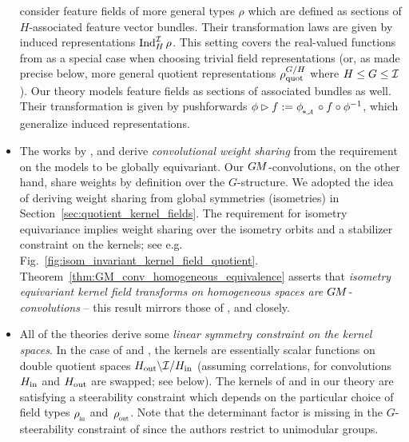 \begin{itemize}
{        }
        \citet{Cohen2018-intertwiners}\cite{Cohen2019-generaltheory} consider feature fields of more general types $\rho$
        which are defined as sections of $H$-associated feature vector bundles.
        Their transformation laws are given by induced representations $\operatorname{Ind}_H^{\mathcal{I}} \rho$.
        This setting covers the real-valued functions from \cite{Kondor2018-GENERAL,bekkers2020bspline} as a special case when choosing trivial field representations
        (or, as made precise below, more general quotient representations $\rho_\textup{quot}^{G/H}$ where $H\leq G\leq\mathcal{I}$).
        Our theory models feature fields as sections of associated bundles as well.
        Their transformation is given by pushforwards $\phi \rhd f := \dphiA \circ f \circ \phi^{-1}$, which generalize induced representations.
    \item[{\rule[2.2pt]{2pt}{2pt}}]
        The works by \citet{Kondor2018-GENERAL}, \citet{Cohen2018-intertwiners}\cite{Cohen2019-generaltheory} and \citet{bekkers2020bspline} derive \emph{convolutional weight sharing} from the requirement on the models to be globally equivariant.
        Our $G\mkern-1.4muM$-convolutions, on the other hand, share weights by definition over the $G$-structure.
        We adopted the idea of deriving weight sharing from global symmetries (isometries) in Section~\ref{sec:quotient_kernel_fields}.
        The requirement for isometry equivariance implies weight sharing over the isometry orbits and a stabilizer constraint on the kernels; see e.g. Fig.~\ref{fig:isom_invariant_kernel_field_quotient}.
        Theorem~\ref{thm:GM_conv_homogeneous_equivalence} asserts that \emph{isometry equivariant kernel field transforms on homogeneous spaces are $G\mkern-1.4muM$-convolutions} -- this result mirrors those of \citet{Kondor2018-GENERAL}, \citet{Cohen2018-intertwiners}\cite{Cohen2019-generaltheory} and \citet{bekkers2020bspline}
        closely.
    \item[{\rule[2.2pt]{2pt}{2pt}}]
        All of the theories derive some \emph{linear symmetry constraint on the kernel spaces}.
        In the case of \citet{Kondor2018-GENERAL} and \citet{bekkers2020bspline}, the kernels are essentially scalar functions on double quotient spaces $H_{\textup{out}}\backslash \mathcal{I}/H_{\textup{in}}$ (assuming correlations, for convolutions $H_{\textup{in}}$ and $H_{\textup{out}}$ are swapped; see below).
        The kernels of \citet{Cohen2018-intertwiners}\cite{Cohen2019-generaltheory} and in our theory are satisfying a steerability constraint which depends on the particular choice of field types $\rhoin$ and~$\rhoout$.
        Note that the determinant factor is missing in the $G$-steerability constraint of \citet{Cohen2018-intertwiners}\cite{Cohen2019-generaltheory} since the authors restrict to unimodular groups.

\end{itemize}
